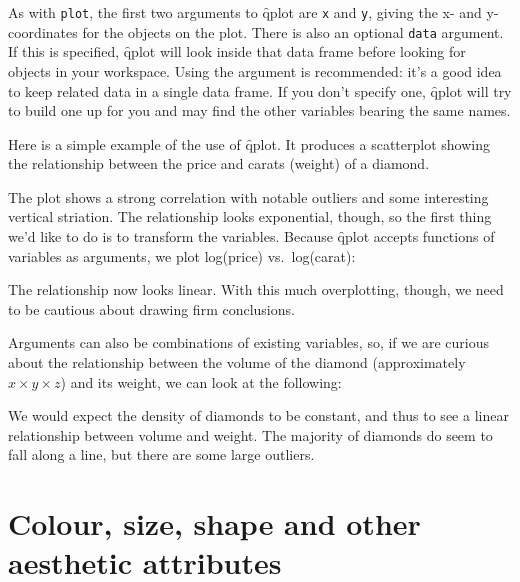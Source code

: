 As with  {\tt plot}, the first two arguments to \f{qplot} are {\tt x} and {\tt y}, giving the x- and y-coordinates for the objects on the plot. There is also an optional {\tt data} argument.  If this is specified, \f{qplot} will look inside that data frame before looking for objects in your workspace.  Using the  argument is recommended: it's a good idea to keep related data in a single data frame.  If you don't specify one, \f{qplot} will try to build one up for you and may find the other variables bearing the same names.

Here is a simple example of the use of \f{qplot}.  It produces a scatterplot showing the relationship between the price and carats (weight) of a diamond. 
% 


The plot shows a strong correlation with notable outliers and some interesting vertical striation.  The relationship looks exponential, though, so the first thing we'd like to do is to transform the variables.  Because \f{qplot} accepts functions of variables as arguments, we plot log(price) vs.\ log(carat):

% 


\noindent The relationship now looks linear.  With this much overplotting, though, we need to be cautious about drawing firm conclusions.

Arguments can also be combinations of existing variables, so, if we are curious about the relationship between the volume of the diamond (approximately $x \times y \times z$) and its weight, we can look at the following:

% 


We would expect the density of diamonds to be constant, and thus to see a linear relationship between volume and weight. The majority of diamonds do seem to fall along a line, but there are some large outliers.


\section{Colour, size, shape and other aesthetic attributes}\label{sec:aesthetic_attributes}

